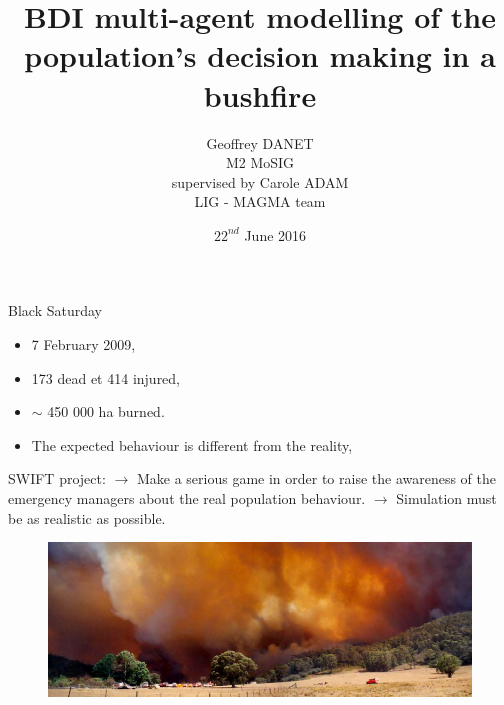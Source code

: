 \documentclass{beamer}
\title{BDI multi-agent modelling of the population's decision making in a bushfire}
\author{Geoffrey DANET\\M2 MoSIG\\ supervised by Carole ADAM\\LIG - MAGMA team}
\date{$22^{nd}$ June 2016}
\begin{document}
  \begin{frame}
    \titlepage
  \end{frame}

  \begin{frame}{Black Saturday}
    \begin{itemize}
      \item 7 February 2009,
      \item 173 dead et 414 injured,
      \item \begin{math}\sim\end{math} 450 000 ha burned.
      \item The expected behaviour is different from the reality,
    \end{itemize}
		SWIFT project:
    \newline
    $\rightarrow$ Make a serious game in order to raise the awareness of the emergency managers about the real population
    behaviour.
    \newline
    $\rightarrow$ Simulation must be as realistic as possible.
    \begin{figure}[h]
      \includegraphics[scale=0.4]{canberra-2003-cropped.jpg}
    \end{figure}
  \end{frame}
\end{document}
